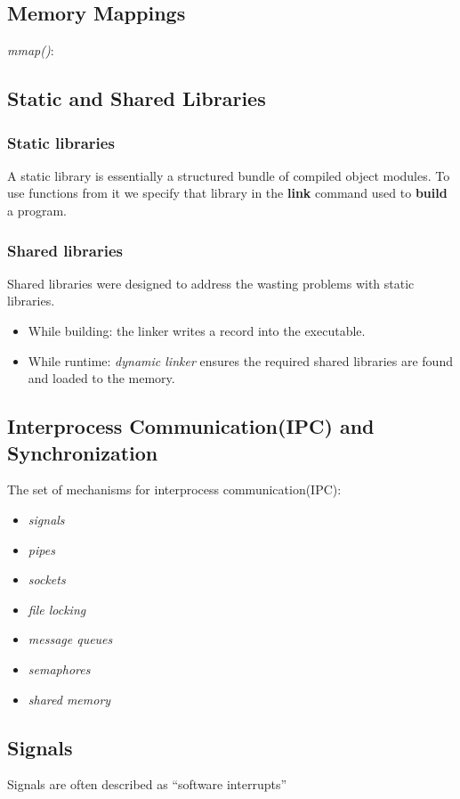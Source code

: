 \documentclass{article}
\begin{document}
\subsection{Memory Mappings}
\textit{mmap()}:




\subsection{Static and Shared Libraries}
\subsubsection*{Static libraries}
A static library is essentially a structured bundle of compiled object modules. To use functions from it we specify that library in the \textbf{link} command used to \textbf{build} a program.
\subsubsection*{Shared libraries}
Shared libraries were designed to address the wasting problems with static libraries.
\begin{itemize}
\item While building: the linker writes a record into the executable.
\item While runtime: \textit{dynamic linker} ensures the required shared libraries are found and loaded to the memory.
\end{itemize}

\subsection{Interprocess Communication(IPC) and Synchronization}
The set of mechanisms for interprocess communication(IPC):
\begin{itemize}
\item \textit{signals}
\item \textit{pipes}
\item \textit{sockets}
\item \textit{file locking}
\item \textit{message queues}
\item \textit{semaphores}
\item \textit{shared memory}
\end{itemize}

\subsection{Signals}
Signals are often described as ``software interrupts''
\end{document}
